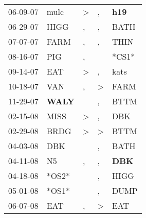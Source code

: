 \begin{supertabular}{p{0.07\textwidth}p{0.06\textwidth}p{0.02\textwidth}p{0.02\textwidth}p{0.06\textwidth}}
          06-09-07\textsuperscript{} &           mulc\textsuperscript{} &     \textgreater &                , &   \textbf{h19\textsuperscript{}} \\
          06-29-07\textsuperscript{} &           HIGG\textsuperscript{} &                , &                , &           BATH\textsuperscript{} \\
          07-07-07\textsuperscript{} &           FARM\textsuperscript{} &                , &                , &           THIN\textsuperscript{} \\
          08-16-07\textsuperscript{} &            PIG\textsuperscript{} &                , &                  &                            *CS1* \\
          09-14-07\textsuperscript{} &            EAT\textsuperscript{} &     \textgreater &                , &           kats\textsuperscript{} \\
          10-18-07\textsuperscript{} &            VAN\textsuperscript{} &                , &     \textgreater &           FARM\textsuperscript{} \\
          11-29-07\textsuperscript{} &  \textbf{WALY\textsuperscript{}} &                  &                , &           BTTM\textsuperscript{} \\
          02-15-08\textsuperscript{} &           MISS\textsuperscript{} &     \textgreater &                , &            DBK\textsuperscript{} \\
          02-29-08\textsuperscript{} &           BRDG\textsuperscript{} &     \textgreater &     \textgreater &           BTTM\textsuperscript{} \\
          04-03-08\textsuperscript{} &            DBK\textsuperscript{} &                  &                , &           BATH\textsuperscript{} \\
          04-11-08\textsuperscript{} &             N5\textsuperscript{} &                , &                , &   \textbf{DBK\textsuperscript{}} \\
          04-18-08\textsuperscript{} &                            *OS2* &                  &                , &           HIGG\textsuperscript{} \\
          05-01-08\textsuperscript{} &                            *OS1* &                  &                , &           DUMP\textsuperscript{} \\
          06-07-08\textsuperscript{} &            EAT\textsuperscript{} &                , &     \textgreater &            EAT\textsuperscript{} \\

\end{supertabular}
